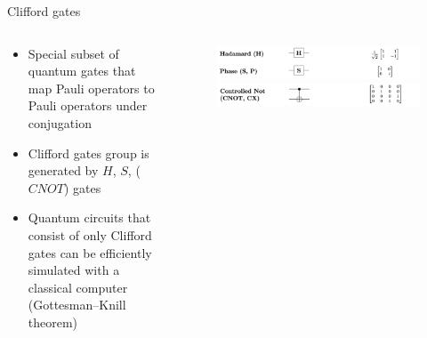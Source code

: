 \documentclass[aspectratio=169,10pt]{beamer}
\begin{document}
\begin{frame}{Clifford gates}
  \begin{columns}
    \begin{column}{0.4\textwidth}
      \begin{itemize}[label=\textbullet]
        \item Special subset of quantum gates that map Pauli operators to Pauli operators under conjugation
        \hspace{10mm}
        \item Clifford gates group is generated by $H$, $S$, ($CNOT$) gates
        \hspace{10mm}
        \item Quantum circuits that consist of only Clifford gates can be efficiently simulated with a classical computer (Gottesman–Knill theorem)
      \end{itemize}
    \end{column}
    \begin{column}{0.6\textwidth}
      \begin{figure}
        \centering
        \includegraphics[width=\textwidth]{figures/HS.png}
        \includegraphics[width=\textwidth]{figures/CNOT.png}
        \vfill
      \end{figure}
    \end{column}
  \end{columns}
\end{frame}
\end{document}
